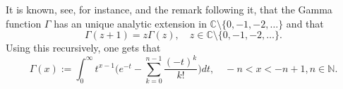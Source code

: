 \documentclass[12pt,a4paper]{amsart}
\theoremstyle{plain}
\theoremstyle{definition}
\numberwithin{equation}{section}
\begin{document}
It is known, see, for instance, \cite[Theorem 6.1.3]{SteinShakarchi2003Complex} and the remark following it, that the Gamma function $\Gamma$ has an unique analytic extension in $\mathbb C\setminus\{0, -1,-2,\dots\}$ and that
\[
	\Gamma(z+1) = z \Gamma(z),\quad z\in \mathbb C\setminus\{0, -1,-2,\dots\}.
\]
Using this recursively, one gets that
\begin{equation}
  \label{eq: definition of Gamma function}
  \Gamma(x)
  := \int_0^\infty t^{x-1} \Big(e^{-t} - \sum_{k=0}^{n-1} \frac{(-t)^k}{k!}\Big) dt,
  \quad -n< x< -n+1, n\in \mathbb N.
\end{equation}
\end{document}
